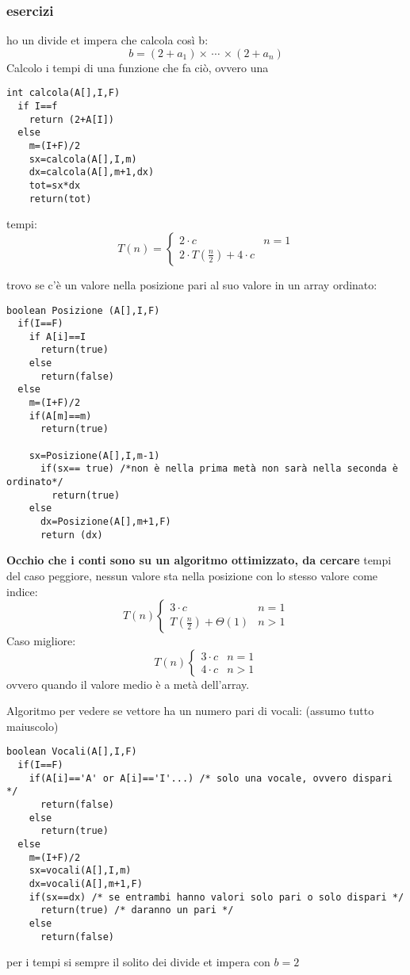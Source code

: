 \documentclass[a4paper,12pt,oneside,tikz]{book}
\begin{document}
\subsubsection{esercizi}
\begin{esercizio}
ho un divide et impera che calcola così b:
$$b=(2+a_1)\times\,\cdots\,\times(2+a_n)$$
Calcolo i tempi di una funzione che fa ciò, ovvero una \begin{verbatim}
int calcola(A[],I,F)
  if I==f
    return (2+A[I])
  else 
    m=(I+F)/2
    sx=calcola(A[],I,m)
    dx=calcola(A[],m+1,dx)
    tot=sx*dx
    return(tot)
\end{verbatim}
tempi:
$$T(n)=\begin{cases}
2\cdot c & n=1\\
2\cdot T\left(\frac{n}{2}\right)+4\cdot c
\end{cases}$$
\end{esercizio}
\begin{esercizio}
trovo se c'è un valore nella posizione pari al suo valore in un array ordinato:
\begin{verbatim}
boolean Posizione (A[],I,F)
  if(I==F)
    if A[i]==I
      return(true)
    else 
      return(false)
  else
    m=(I+F)/2
    if(A[m]==m)
      return(true)

    sx=Posizione(A[],I,m-1)
      if(sx== true) /*non è nella prima metà non sarà nella seconda è ordinato*/
        return(true)
    else
      dx=Posizione(A[],m+1,F)
      return (dx)
\end{verbatim}
\textbf{Occhio che i conti sono su un algoritmo ottimizzato, da cercare}
tempi del caso peggiore, nessun valore sta nella posizione con lo stesso valore come indice:
$$T(n)\begin{cases}
3\cdot c & n=1\\
T\left(\frac{n}{2}\right)+\Theta(1) & n>1
\end{cases}$$
Caso migliore:
$$T(n)\begin{cases}
3\cdot c & n=1\\
4\cdot c & n>1
\end{cases}$$
ovvero quando il valore medio è a metà dell'array.
\end{esercizio}
\begin{esercizio}
Algoritmo per vedere se vettore ha un numero pari di vocali:
(assumo tutto maiuscolo)
\begin{verbatim}
boolean Vocali(A[],I,F)
  if(I==F)
    if(A[i]=='A' or A[i]=='I'...) /* solo una vocale, ovvero dispari */
      return(false)
    else
      return(true)
  else 
    m=(I+F)/2
    sx=vocali(A[],I,m)
    dx=vocali(A[],m+1,F)
    if(sx==dx) /* se entrambi hanno valori solo pari o solo dispari */
      return(true) /* daranno un pari */
    else
      return(false)
\end{verbatim}
per i tempi si sempre il solito dei divide et impera con $b=2$
\end{esercizio}
\newpage
\end{document}
